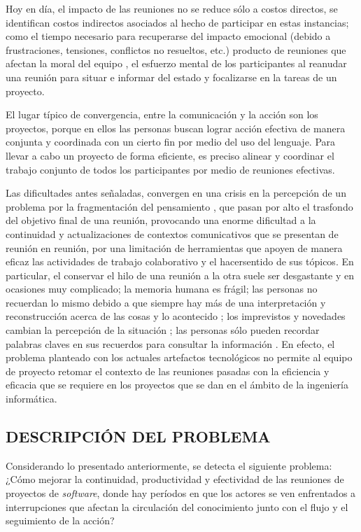 Hoy en día, el impacto de las reuniones no se reduce sólo a costos directos, se identifican costos indirectos asociados al hecho de participar en estas instancias; como el tiempo necesario para recuperarse del impacto emocional (debido a frustraciones, tensiones, conflictos no resueltos, etc.) producto de reuniones que afectan la moral del equipo , el esfuerzo mental de los participantes al reanudar una reunión para situar e informar del estado y focalizarse en la tareas de un proyecto.

El lugar típico de convergencia, entre la comunicación y la acción son los proyectos, porque en ellos las personas buscan lograr acción efectiva de manera conjunta y coordinada con un cierto fin por medio del uso del lenguaje. Para llevar a cabo un proyecto de forma eficiente, es preciso alinear y coordinar el trabajo conjunto de todos los participantes por medio de reuniones efectivas.

Las dificultades antes se\~naladas, convergen en una crisis en la percepción de un problema por la fragmentación del pensamiento , que pasan por alto el trasfondo del objetivo final de una reunión, provocando una enorme dificultad a la continuidad y actualizaciones de contextos comunicativos que se presentan de reunión en reunión, por una limitación de herramientas que apoyen de manera eficaz las actividades de trabajo colaborativo  y el hacer\-sentido de sus tópicos. En particular, el conservar el hilo de una reunión a la otra suele ser desgastante y en ocasiones muy complicado; la memoria humana es frágil; las personas no recuerdan lo mismo debido a que siempre hay más de una interpretación y reconstrucción acerca de las cosas y lo acontecido ; los imprevistos y novedades cambian la percepción de la situación ; las personas sólo pueden recordar palabras claves en sus recuerdos para consultar la información . En efecto, el problema planteado con los actuales artefactos tecnológicos no permite al equipo de proyecto retomar el contexto de las reuniones pasadas con la eficiencia y eficacia que se requiere en los proyectos que se dan en el ámbito de la ingeniería informática.

\subsection{DESCRIPCIÓN DEL PROBLEMA}

Considerando lo presentado anteriormente, se detecta el siguiente problema: ¿Cómo mejorar la continuidad, productividad y efectividad de las reuniones de proyectos de \textit{software}, donde hay períodos en que los actores se ven enfrentados a interrupciones que afectan la circulación del conocimiento junto con el flujo y el seguimiento de la acción?

